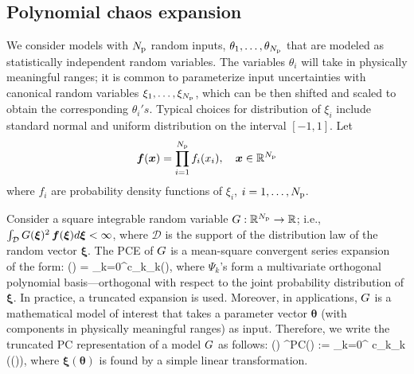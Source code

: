 \subsection{Polynomial chaos expansion}

We consider models with ${N_\text{p}}$ random inputs, 
$\theta_1, \ldots, \theta_{N_\text{p}}$ that are modeled
as statistically independent random variables. The 
variables $\theta_i$ will take in physically meaningful
ranges; it is common to parameterize input uncertainties
with canonical random variables $\xi_1, \ldots, \xi_{N_\text{p}}$,
which can be then shifted and scaled to obtain the corresponding $\theta_i's$.
Typical choices for distribution of $\xi_i$ include standard normal 
and uniform distribution on the interval $[-1, 1]$.
Let 
\[
   \bm{f}(\bm{x}) = \prod_{i=1}^{N_\text{p}} f_i(x_i), \quad \bm{x} \in \mathbb{R}^{N_\text{p}}
\]
where $f_i$ are probability density functions of $\xi_i$, $i = 1, \ldots, {N_\text{p}}$.

Consider a square integrable random variable $G:\mathbb{R}^{N_\text{p}} \to \mathbb{R}$; 
i.e.,
$\int_{\mathcal{D}} G(\bm{\xi})^2 \, \bm{f}(\bm{\xi})d\bm{\xi} < \infty$,
where $\mathcal{D}$ is the support of the distribution law of the random vector
$\bm{\xi}$. 
%
The PCE of
$G$ is a mean-square 
convergent series expansion~\cite{Xiu:2002,Ghanem:2003,Olivier:2010} of the form:
\be
\GG(\bm\xi) = \sum_{k=0}^\infty c_k\Psi_k(\bm{\xi}),
\ee
where $\Psi_k$'s form a multivariate orthogonal polynomial
basis---orthogonal with respect to the joint probability distribution of $\bm{\xi}$.
%
In practice, a truncated expansion is used.  Moreover, in applications, $G$
is a mathematical model of interest that takes a parameter vector $\bm{\theta}$
(with components in physically meaningful ranges) as input. Therefore, we 
write the truncated PC representation of a model $G$ as follows:
\be 
\GG(\bm\theta) \approx \GG^{\mbox{\tiny PC}}(\bm\theta) := \sum_{k=0}^{\Npc}
c_k\Psi_k (\bm\xi(\bm\theta)), 
\ee
where $\bm\xi(\bm\theta)$ is found by a simple linear transformation.

